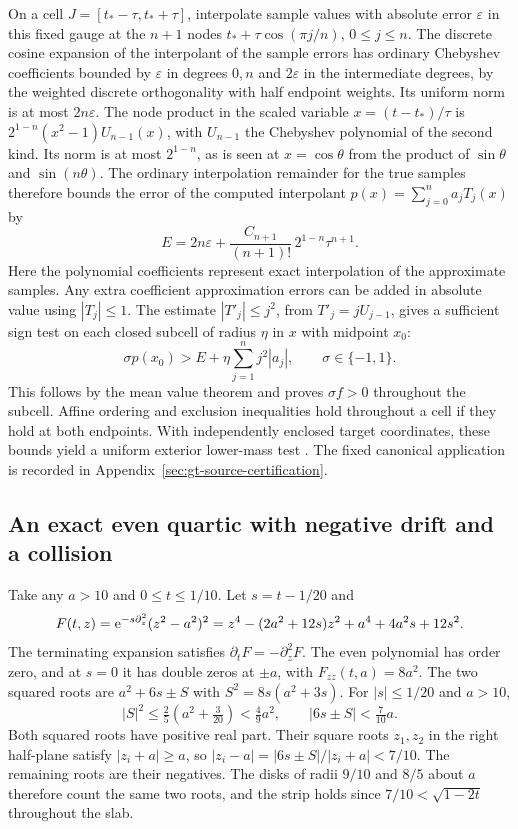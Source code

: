 On a cell \(J=[t_*-\tau,t_*+\tau]\), interpolate sample values
with absolute error \(\varepsilon\) in this fixed gauge at the
\(n+1\) nodes \(t_*+\tau\cos(\pi j/n)\), \(0\le j\le n\).
The discrete cosine expansion of the interpolant of the sample
errors has ordinary Chebyshev coefficients bounded by
\(\varepsilon\) in degrees \(0,n\) and \(2\varepsilon\) in the
intermediate degrees, by the weighted discrete orthogonality with
half endpoint weights. Its uniform norm is at most \(2n\varepsilon\).
The node product in the scaled variable \(x=(t-t_*)/\tau\) is
\(2^{1-n}(x^2-1)U_{n-1}(x)\), with \(U_{n-1}\) the Chebyshev
polynomial of the second kind. Its norm is at most \(2^{1-n}\),
as is seen at \(x=\cos\theta\) from the product of
\(\sin\theta\) and \(\sin(n\theta)\). The ordinary interpolation
remainder for the true samples therefore bounds the error of the
computed interpolant \(p(x)=\sum_{j=0}^n a_jT_j(x)\) by
\[
 E=2n\varepsilon+
     \frac{C_{n+1}}{(n+1)!}\,2^{1-n}\tau^{n+1}.
\]
Here the polynomial coefficients represent exact interpolation of
the approximate samples. Any extra coefficient approximation errors
can be added in absolute value using \(|T_j|\le1\).
The estimate \(|T'_j|\le j^2\), from
\(T'_j=jU_{j-1}\), gives a sufficient sign test on each closed
subcell of radius \(\eta\) in \(x\) with midpoint \(x_0\):
\[
 \sigma p(x_0)>E+\eta\sum_{j=1}^n j^2|a_j|,\qquad \sigma\in\{-1,1\}.
\]
This follows by the mean value theorem and proves \(\sigma f>0\)
throughout the subcell. Affine ordering and exclusion inequalities
hold throughout a cell if they hold at both endpoints.
With independently enclosed target coordinates, these bounds yield
a uniform exterior lower-mass test \cite{gtbrackets}. The fixed
canonical application is recorded in
Appendix~\ref{sec:gt-source-certification}.

\subsection{An exact even quartic with negative drift and a collision}

Take any \(a>10\) and \(0\le t\le 1/10\). Let \(s=t-1/20\) and
\[
 F(t,z)=\mathrm e^{-s\partial_z^2}(z^2-a^2)^2
       =z^4-(2a^2+12s)z^2+a^4+4a^2s+12s^2.
\]
The terminating expansion satisfies \(\partial_tF=-\partial_z^2F\).
The even polynomial has order zero, and at \(s=0\) it has double
zeros at \(\pm a\), with \(F_{zz}(t,a)=8a^2\). The two squared
roots are \(a^2+6s\pm S\) with \(S^2=8s(a^2+3s)\). For
\(|s|\le1/20\) and \(a>10\),
\[
 |S|^2\le\tfrac25(a^2+\tfrac3{20})<\tfrac49 a^2,\qquad
 |6s\pm S|<\tfrac7{10}a .
\]
Both squared roots have positive real part. Their square roots
\(z_1,z_2\) in the right half-plane satisfy \(|z_i+a|\ge a\), so
\(|z_i-a|=|6s\pm S|/|z_i+a|<7/10\). The remaining roots are
their negatives. The disks of radii \(9/10\) and \(8/5\) about \(a\)
therefore count the same two roots, and the strip holds since
\(7/10<\sqrt{1-2t}\) throughout the slab.

